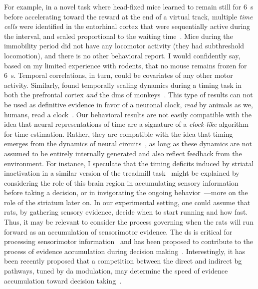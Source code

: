 For example, in a novel task where head-fixed mice learned to remain still for 6~s before accelerating toward the reward at the end of a virtual track, multiple \textit{time cells} were identified in the entorhinal cortex that were sequentially active during the interval, and scaled proportional to the waiting time~\cite{Heys2018NN}.
Mice during the immobility period did not have any locomotor activity (they had subthreshold locomotion), and there is no other behavioral report.
I would confidently say, based on my limited experience with rodents, that no mouse remains frozen for 6~s.
Temporal correlations, in turn, could be covariates of any other motor activity.
Similarly,  found temporally scaling dynamics during a timing task in both the prefrontal cortex \textit{and} the \gls{dms} of monkeys~\cite{JazayeriNN2018}.
This type of results can not be used as definitive evidence in favor of a neuronal clock, \emph{read}\! by animals as we, humans, read a clock~\cite{Krakauer2017Neuron, Buzsaki2017SciRev, Buzsaki2018TICS}.
Our behavioral results are not easily compatible with the idea that neural representations of time are a signature of a \emph{clock-like}\! algorithm for time estimation.
Rather, they are compatible with the idea that timing emerges from the dynamics of neural circuits~\cite{Paton2018NeuronRev}, as long as these dynamics are not assumed to be entirely internally generated and also reflect feedback from the environment.
For instance, I speculate that the timing deficits induced by striatal inactivation in a similar version of the treadmill task~\cite{Rueda2015NN} might be explained by considering the role of this brain region in accumulating sensory information before taking a decision, or in invigorating the ongoing behavior~\cite{Yartsev2018eLife,Dunovan2016FrontNeurosci}---more on the role of the striatum later on.
In our experimental setting, one could assume that rats, by gathering sensory evidence, decide when to start running and how fast.
Thus, it may be relevant to consider the process governing when the rats will run forward as an accumulation of sensorimotor evidence.
The \gls{ds} is critical for processing sensorimotor information~\cite{Robbe2018} and has been proposed to contribute to the process of evidence accumulation during decision making~\cite{Yartsev2018eLife}.
Interestingly, it has been recently proposed that a competition between the direct and indirect \gls{bg} pathways, tuned by \gls{da} modulation, may determine the speed of evidence accumulation toward decision taking~\cite{Dunovan2016FrontNeurosci}.
